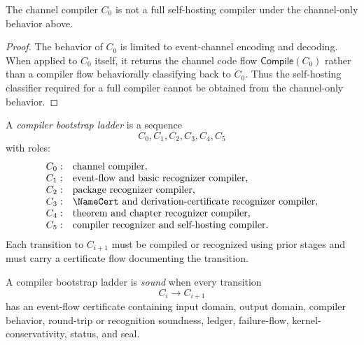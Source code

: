 \begin{proposition}
\label{prop:self-hosting-compiler-c0-not-full}
The channel compiler $C_0$ is not a full self-hosting compiler under the
channel-only behavior above.
\end{proposition}

\begin{proof}
The behavior of $C_0$ is limited to event-channel encoding and decoding. When
applied to $C_0$ itself, it returns the channel code flow
$\mathsf{Compile}(C_0)$ rather than a compiler flow behaviorally classifying
back to $C_0$. Thus the self-hosting classifier required for a full compiler
cannot be obtained from the channel-only behavior.
\end{proof}

\begin{definition}
\label{def:self-hosting-compiler-bootstrap-ladder}
A \emph{compiler bootstrap ladder} is a sequence
$$
  C_0,C_1,C_2,C_3,C_4,C_5
$$
with roles:
$$
\begin{array}{ll}
  C_0:& \text{channel compiler},\\
  C_1:& \text{event-flow and basic recognizer compiler},\\
  C_2:& \text{package recognizer compiler},\\
  C_3:& \text{$\NameCert$ and derivation-certificate recognizer compiler},\\
  C_4:& \text{theorem and chapter recognizer compiler},\\
  C_5:& \text{compiler recognizer and self-hosting compiler}.
\end{array}
$$
Each transition to $C_{i+1}$ must be compiled or recognized using prior stages and must carry a certificate flow documenting the transition.
\end{definition}

\begin{definition}
\label{def:self-hosting-compiler-ladder-soundness}
A compiler bootstrap ladder is \emph{sound} when every transition
$$
  C_i\to C_{i+1}
$$
has an event-flow certificate containing input domain, output domain, compiler behavior, round-trip or recognition soundness, ledger, failure-flow, kernel-conservativity, status, and seal.
\end{definition}


